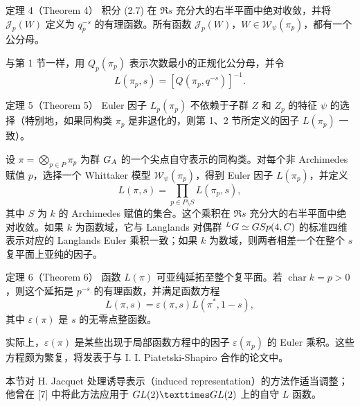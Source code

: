 \begin{originaltheorem}{定理 4（Theorem 4）}
积分 (2.7) 在 $\Re s$ 充分大的右半平面中绝对收敛，并将 $\mathcal J_p(W)$ 定义为 $q_p^{-s}$ 的有理函数。所有函数 $\mathcal J_p(W)$，$W\in\mathcal W_\psi(\pi_p)$，都有一个公分母。
\end{originaltheorem}

与第 1 节一样，用 $Q_p(\pi_p)$ 表示次数最小的正规化公分母，并令
\begin{equation}
 L(\pi_p,s)=[Q(\pi_p,q^{-s})]^{-1}.
 \tag{2.8}
\end{equation}

\begin{originaltheorem}{定理 5（Theorem 5）}
Euler 因子 $L_p(\pi_p)$ 不依赖于子群 $Z$ 和 $Z_p$ 的特征 $\psi$ 的选择（特别地，如果同构类 $\pi_p$ 是非退化的，则第 1、2 节所定义的因子 $L(\pi_p)$ 一致）。
\end{originaltheorem}

设 $\pi=\bigotimes_{p\in P}\pi_p$ 为群 $G_A$ 的一个尖点自守表示的同构类。对每个非 Archimedes 赋值 $p$，选择一个 Whittaker 模型 $\mathcal W_\psi(\pi_p)$，得到 Euler 因子 $L(\pi_p)$，并定义
\begin{equation}
 L(\pi,s)=\prod_{p\in P\setminus S}L(\pi_p,s),
 \tag{2.9}
\end{equation}
其中 $S$ 为 $k$ 的 Archimedes 赋值的集合。这个乘积在 $\Re s$ 充分大的右半平面中绝对收敛。如果 $k$ 为函数域，它与 Langlands 对偶群 ${}^LG\simeq GSp(4,C)$ 的标准四维表示对应的 Langlands Euler 乘积一致；如果 $k$ 为数域，则两者相差一个在整个 $s$ 复平面上亚纯的因子。

\begin{originaltheorem}{定理 6（Theorem 6）}
函数 $L(\pi)$ 可亚纯延拓至整个复平面。若 $\operatorname{char}k=p>0$，则这个延拓是 $p^{-s}$ 的有理函数，并满足函数方程
\begin{equation}
 L(\pi,s)=\varepsilon(\pi,s)L(\pi^*,1-s),
 \tag{2.10}
\end{equation}
其中 $\varepsilon(\pi)$ 是 $s$ 的无零点整函数。
\end{originaltheorem}

实际上，$\varepsilon(\pi)$ 是某些出现于局部函数方程中的因子 $\varepsilon(\pi_p)$ 的 Euler 乘积。这些方程颇为繁复，将发表于与 I. I. Piatetski-Shapiro 合作的论文中。

本节对 H. Jacquet 处理诱导表示（induced representation）的方法作适当调整；他曾在 [7] 中将此方法应用于 $\GL(2)\times\GL(2)$ 上的自守 $L$ 函数。

